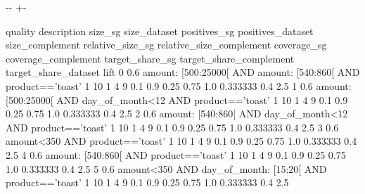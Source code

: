 \documentclass[letterpaper,10pt,english]{sphinxmanual}
\newlength\nbsphinxcodecellspacing
\begin{document}
{

\kern-\sphinxverbatimsmallskipamount\kern-\baselineskip
\kern+\FrameHeightAdjust\kern-\fboxrule
\vspace{\nbsphinxcodecellspacing}

\begin{sphinxVerbatim}[commandchars=\\\{\}]
\llap{\color{nbsphinxout}[5]:\,\hspace{\fboxrule}\hspace{\fboxsep}}   quality                                                     description  size\_sg  size\_dataset  positives\_sg  positives\_dataset  size\_complement  relative\_size\_sg  relative\_size\_complement  coverage\_sg  coverage\_complement  target\_share\_sg  target\_share\_complement  target\_share\_dataset  lift
0      0.6  amount: [500:25000[ AND amount: [540:860[ AND product=='toast'        1            10             1                  4                9               0.1                       0.9         0.25                 0.75              1.0                 0.333333                   0.4   2.5
1      0.6    amount: [500:25000[ AND day\_of\_month<12 AND product=='toast'        1            10             1                  4                9               0.1                       0.9         0.25                 0.75              1.0                 0.333333                   0.4   2.5
2      0.6      amount: [540:860[ AND day\_of\_month<12 AND product=='toast'        1            10             1                  4                9               0.1                       0.9         0.25                 0.75              1.0                 0.333333                   0.4   2.5
3      0.6                                 amount<350 AND product=='toast'        1            10             1                  4                9               0.1                       0.9         0.25                 0.75              1.0                 0.333333                   0.4   2.5
4      0.6                          amount: [540:860[ AND product=='toast'        1            10             1                  4                9               0.1                       0.9         0.25                 0.75              1.0                 0.333333                   0.4   2.5
5      0.6       amount<350 AND day\_of\_month: [15:20[ AND product=='toast'        1            10             1                  4                9               0.1                       0.9         0.25                 0.75              1.0                 0.333333                   0.4   2.5

\end{sphinxVerbatim}}
\end{document}

